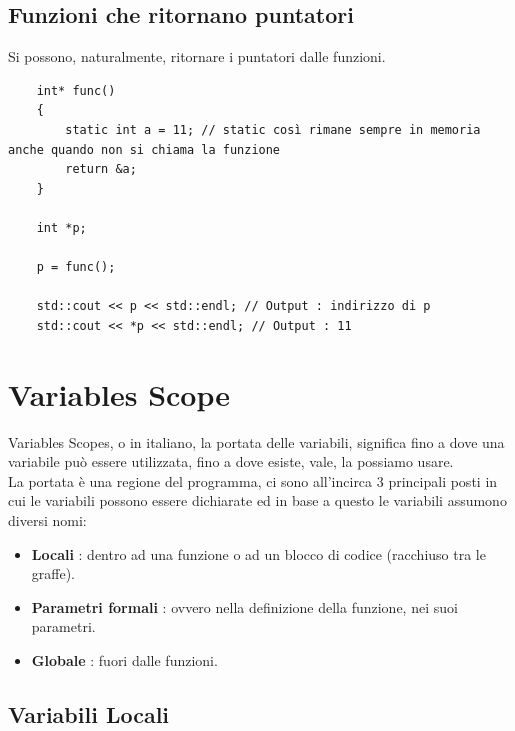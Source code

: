\subsection{Funzioni che ritornano puntatori}

\textsf{\small Si possono, naturalmente, ritornare i puntatori dalle funzioni.}

\begin{lstlisting}
	int* func()
	{
		static int a = 11; // static così rimane sempre in memoria anche quando non si chiama la funzione
		return &a;
	}

	int *p;
	
	p = func();
	
	std::cout << p << std::endl; // Output : indirizzo di p
	std::cout << *p << std::endl; // Output : 11
\end{lstlisting}



\section{Variables Scope}

\textsf{\small Variables Scopes, o in italiano, la portata delle variabili, significa fino a dove una variabile può essere utilizzata, fino a dove esiste, vale, la possiamo usare.} \\

\textsf{\small La portata è una regione del programma, ci sono all'incirca 3 principali posti in cui le variabili possono essere dichiarate ed in base a questo le variabili assumono diversi nomi: }

\begin{itemize}
	\item \textsf{\small \textbf{Locali} : dentro ad una funzione o ad un blocco di codice (racchiuso tra le graffe).}
	\item \textsf{\small \textbf{Parametri formali} : ovvero nella definizione della funzione, nei suoi parametri.}
	\item \textsf{\small \textbf{Globale} : fuori dalle funzioni.}
\end{itemize}

\subsection{Variabili Locali}

